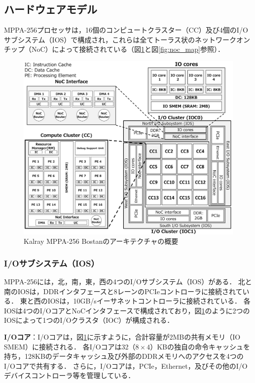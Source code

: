 \documentclass[submit,techrep]{ipsj_v2/UTF8/ipsj}
\begin{document}
\subsection{ハードウェアモデル}
\label{sec:hardware_model}
MPPA-256プロセッサは，16個のコンピュートクラスター（CC）及び4個のI/Oサブシステム（IOS）で構成され，これらは全てトーラス状のネットワークオンチップ（NoC）によって接続されている（図\ref{fig:mppa_architecture}と図\ref{fig:noc_map}参照）．

\begin{figure}[t]
  \centering
  \includegraphics[width=1.0\linewidth]{../figure/mppa_architecture.pdf}
  \caption{\label{fig:mppa_architecture}
    Kalray MPPA-256 Bostanのアーキテクチャの概要}
\end{figure}

\setlength{\headheight}{0pt}

\subsubsection{I/Oサブシステム（IOS）}
\label{sec:ios}
MPPA-256には，北，南，東，西の4つのI/Oサブシステム（IOS）がある．
北と南のIOSは，DDRインタフェースと8レーンのPCIeコントローラに接続されている．
東と西のIOSは，10GB/sイーサネットコントローラに接続されている．
各IOSは4つのI/OコアとNoCインタフェースで構成されており，図\ref{fig:mppa_architecture}のように2つのIOSによって1つのI/Oクラスタ（IOC）が構成される．

\textbf{I/Oコア}：I/Oコアは，図\ref{fig:mppa_architecture}に示すように，合計容量が2MBの共有メモリ（IO SMEM）に接続される．
各I/Oコアは32（$ 8 \times 4 $）KBの独自の命令キャッシュを持ち，128KBのデータキャッシュ及び外部のDDRメモリへのアクセスを4つのI/Oコアで共有する．
さらに，I/Oコアは，PCIe，Ethernet，及びその他のI/Oデバイスコントローラ等を管理している．
\end{document}
